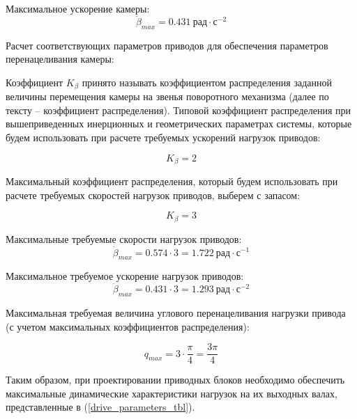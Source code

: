 Максимальное ускорение камеры:
\begin{equation}
    \ddot{\beta}_{max} = 0.431 ~\textit{рад} \cdot \textit{с}^{-2}
\end{equation}

Расчет соответствующих параметров приводов для обеспечения параметров перенацеливания камеры:

Коэффициент $ K_{\beta} $  принято называть коэффициентом распределения заданной величины перемещения камеры на
звенья поворотного механизма (далее по тексту – коэффициент распределения).
Типовой коэффициент распределения при вышеприведенных инерционных и геометрических параметрах
системы, которые будем использовать при расчете требуемых ускорений нагрузок приводов:

\begin{equation}
    K_{\beta} = 2
\end{equation}

Максимальный коэффициент распределения, который будем использовать при расчете требуемых скоростей
нагрузок приводов, выберем с запасом:

\begin{equation}
    K_{\beta} = 3
\end{equation}

Максимальные требуемые скорости нагрузок приводов:
\begin{equation}
    \dot{\beta}_{max} = 0.574 \cdot 3 = 1.722 ~\textit{рад} \cdot \textit{с}^{-1}
\end{equation}

Максимальное требуемое ускорение нагрузок приводов:
\begin{equation}
    \ddot{\beta}_{max} = 0.431 \cdot 3 = 1.293 ~\textit{рад} \cdot \textit{с}^{-2}
\end{equation}

Максимальная требуемая величина углового перенацеливания нагрузки привода (с учетом максимальных
коэффициентов распределения):

\begin{equation}
    q_{max} = 3 \cdot \frac{\pi}{4} = \frac{3 \pi}{4}
\end{equation}

Таким образом, при проектировании приводных блоков необходимо обеспечить максимальные динамические
характеристики нагрузок на их выходных валах, представленные в (\ref{drive_parameters_tbl}).

\endinput

\newpage
\subsubsection{Сводная таблица результатов}

